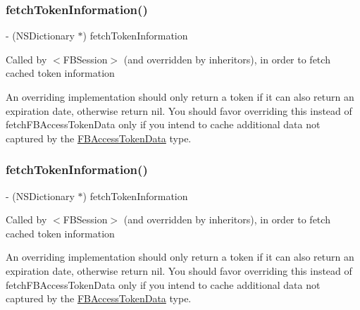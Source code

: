\subsubsection{\texorpdfstring{fetch\+Token\+Information()}{fetchTokenInformation()}\hspace{0.1cm}{\footnotesize\ttfamily [4/5]}}
{\footnotesize\ttfamily -\/ (N\+S\+Dictionary $\ast$) fetch\+Token\+Information \begin{DoxyParamCaption}{ }\end{DoxyParamCaption}}

Called by $<$\+F\+B\+Session$>$ (and overridden by inheritors), in order to fetch cached token information

An overriding implementation should only return a token if it can also return an expiration date, otherwise return nil. You should favor overriding this instead of {\ttfamily fetch\+F\+B\+Access\+Token\+Data} only if you intend to cache additional data not captured by the \hyperlink{interfaceFBAccessTokenData}{F\+B\+Access\+Token\+Data} type. \mbox{\label{interfaceFBSessionTokenCachingStrategy_a08b75ac08ae3b7a1ad769f3b026f857c}} 
\subsubsection{\texorpdfstring{fetch\+Token\+Information()}{fetchTokenInformation()}\hspace{0.1cm}{\footnotesize\ttfamily [5/5]}}
{\footnotesize\ttfamily -\/ (N\+S\+Dictionary $\ast$) fetch\+Token\+Information \begin{DoxyParamCaption}{ }\end{DoxyParamCaption}}

Called by $<$\+F\+B\+Session$>$ (and overridden by inheritors), in order to fetch cached token information

An overriding implementation should only return a token if it can also return an expiration date, otherwise return nil. You should favor overriding this instead of {\ttfamily fetch\+F\+B\+Access\+Token\+Data} only if you intend to cache additional data not captured by the \hyperlink{interfaceFBAccessTokenData}{F\+B\+Access\+Token\+Data} type. \mbox{\label{interfaceFBSessionTokenCachingStrategy_adf7a7150fecc4aab6dea9e7c0b64760b}} 
